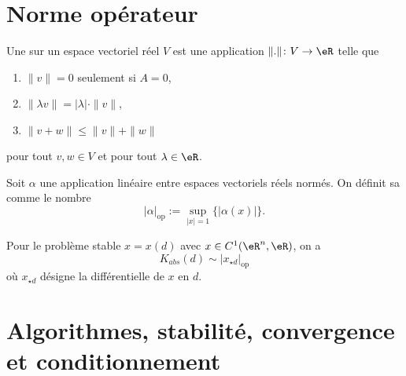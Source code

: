 \section{Norme opérateur}

Une  sur un espace vectoriel réel $V$ est une application $\| . \|\colon V\to \eR$ telle que
\begin{enumerate}
		\label{PgDefNorme}

	\item
		$\| v \|=0$ seulement si $A=0$,
	\item
		$\| \lambda v \|=| \lambda |\cdot\| v \|$,
	\item
		$\| v+w \|\leq\| v \|+\| w \|$

\end{enumerate}
pour tout $v,w\in V$ et pour tout $\lambda\in\eR$.

\begin{definition}
	Soit $\alpha$ une application linéaire entre espaces vectoriels réels normés. On définit sa  comme le nombre
	\begin{equation}
		|\alpha|_{\mbox{op}}:=\sup_{|x|=1}\{|\alpha(x)|\}.
	\end{equation}
\end{definition}

\begin{proposition}	
	Pour le problème stable $x=x(d)$ avec $x\in C^1(\eR^n,\eR)$, on a
	\begin{equation}
		K_{abs}(d)\sim|x_{\star d}|_{\mbox{op}}
	\end{equation}
	où $x_{\star d}$ désigne la différentielle de $x$ en $d$.
\end{proposition}

\section{Algorithmes, stabilité, convergence et conditionnement}

